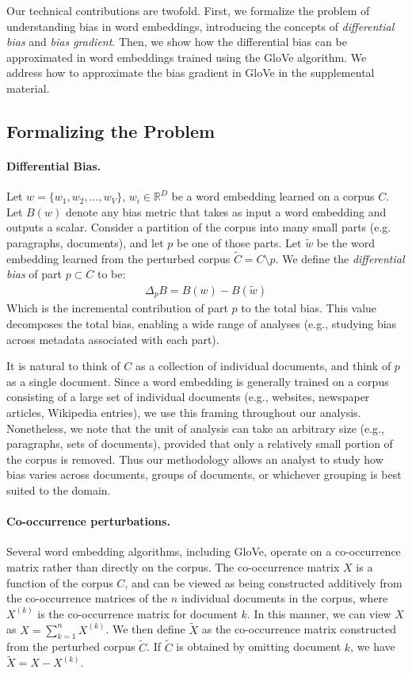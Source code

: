 \documentclass{article}
\newcommand{\xhdr}[1]{\paragraph*{\bf {#1.}}}
\newcommand{\Real}{\mathbb{R}}
\begin{document}
Our technical contributions are twofold. First, we formalize the problem of understanding bias in word embeddings, introducing the concepts of \textit{differential bias} and \textit{bias gradient}. Then, we show how the differential bias can be approximated in word embeddings trained using the GloVe algorithm. We address how to approximate the bias gradient in GloVe in the supplemental material.

\subsection{Formalizing the Problem}
\xhdr{Differential Bias}
Let $w=\{w_1, w_2, ... ,w_V\}$, $w_i \in \Real^D$ be a word embedding learned on a corpus $C$.
Let $B(w)$ denote any bias metric that takes as input a word embedding and outputs a scalar.
Consider a partition of the corpus into many small parts (e.g. paragraphs, documents), and let $p$ be one of those parts.
Let $\tilde{w}$ be the word embedding learned from the perturbed corpus $\tilde{C} = C \setminus p$. 
We define the \textit{differential bias} of part $p \subset C$ to be:
\begin{align}\label{eq:diff_bias}
\Delta_{p} B = B(w) - B(\tilde{w})
\end{align}
Which is the incremental contribution of part $p$ to the total bias. This value decomposes the total bias, enabling a wide range of analyses (e.g., studying bias across metadata associated with each part).

It is natural to think of $C$ as a collection of individual documents, and think of $p$ as a single document. 
Since a word embedding is generally trained on a corpus consisting of a large set of individual documents (e.g., websites, newspaper articles, Wikipedia entries), we use this framing throughout our analysis. 
Nonetheless, we note that the unit of analysis can take an arbitrary size (e.g., paragraphs, sets of documents), provided that only a relatively small portion of the corpus is removed. 
Thus our methodology allows an analyst to study how bias varies across documents, groups of documents, or whichever grouping is best suited to the domain.

\xhdr{Co-occurrence perturbations}
Several word embedding algorithms, including GloVe, operate on a co-occurrence matrix rather than directly on the corpus.
The co-occurrence matrix $X$ is a function of the corpus $C$, and can be viewed as being constructed additively from the co-occurrence matrices of the $n$ individual documents in the corpus, where $X^{(k)}$ is the co-occurrence matrix for document $k$.
In this manner, we can view $X$ as $X = \sum_{k=1}^n X^{(k)}$.
We then define $\tilde{X}$ as the co-occurrence matrix constructed from the perturbed corpus $\tilde{C}$.
If $\tilde{C}$ is obtained by omitting document $k$, we have $\tilde{X} = X - X^{(k)}$.
\end{document}
